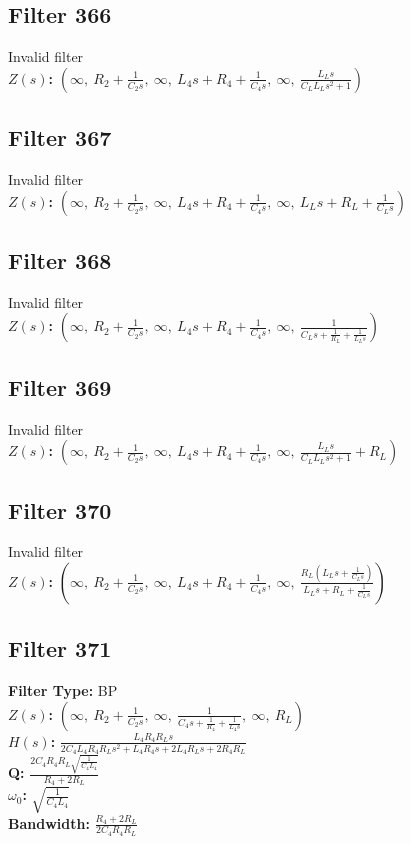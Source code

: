 \documentclass{article}
\begin{document}
\subsection*{Filter 366}
Invalid filter \\ 
\textbf{$Z(s)$:} $\left( \infty, \  R_{2} + \frac{1}{C_{2} s}, \  \infty, \  L_{4} s + R_{4} + \frac{1}{C_{4} s}, \  \infty, \  \frac{L_{L} s}{C_{L} L_{L} s^{2} + 1}\right)$ \\ 
\subsection*{Filter 367}
Invalid filter \\ 
\textbf{$Z(s)$:} $\left( \infty, \  R_{2} + \frac{1}{C_{2} s}, \  \infty, \  L_{4} s + R_{4} + \frac{1}{C_{4} s}, \  \infty, \  L_{L} s + R_{L} + \frac{1}{C_{L} s}\right)$ \\ 
\subsection*{Filter 368}
Invalid filter \\ 
\textbf{$Z(s)$:} $\left( \infty, \  R_{2} + \frac{1}{C_{2} s}, \  \infty, \  L_{4} s + R_{4} + \frac{1}{C_{4} s}, \  \infty, \  \frac{1}{C_{L} s + \frac{1}{R_{L}} + \frac{1}{L_{L} s}}\right)$ \\ 
\subsection*{Filter 369}
Invalid filter \\ 
\textbf{$Z(s)$:} $\left( \infty, \  R_{2} + \frac{1}{C_{2} s}, \  \infty, \  L_{4} s + R_{4} + \frac{1}{C_{4} s}, \  \infty, \  \frac{L_{L} s}{C_{L} L_{L} s^{2} + 1} + R_{L}\right)$ \\ 
\subsection*{Filter 370}
Invalid filter \\ 
\textbf{$Z(s)$:} $\left( \infty, \  R_{2} + \frac{1}{C_{2} s}, \  \infty, \  L_{4} s + R_{4} + \frac{1}{C_{4} s}, \  \infty, \  \frac{R_{L} \left(L_{L} s + \frac{1}{C_{L} s}\right)}{L_{L} s + R_{L} + \frac{1}{C_{L} s}}\right)$ \\ 
\subsection*{Filter 371}
\textbf{Filter Type:} BP \\ 
\textbf{$Z(s)$:} $\left( \infty, \  R_{2} + \frac{1}{C_{2} s}, \  \infty, \  \frac{1}{C_{4} s + \frac{1}{R_{4}} + \frac{1}{L_{4} s}}, \  \infty, \  R_{L}\right)$ \\ 
\textbf{$H(s)$:} $\frac{L_{4} R_{4} R_{L} s}{2 C_{4} L_{4} R_{4} R_{L} s^{2} + L_{4} R_{4} s + 2 L_{4} R_{L} s + 2 R_{4} R_{L}}$ \\ 
\textbf{Q:} $\frac{2 C_{4} R_{4} R_{L} \sqrt{\frac{1}{C_{4} L_{4}}}}{R_{4} + 2 R_{L}}$ \\ 
\textbf{$\omega_0$:} $\sqrt{\frac{1}{C_{4} L_{4}}}$ \\ 
\textbf{Bandwidth:} $\frac{R_{4} + 2 R_{L}}{2 C_{4} R_{4} R_{L}}$ \\ 
\end{document}
